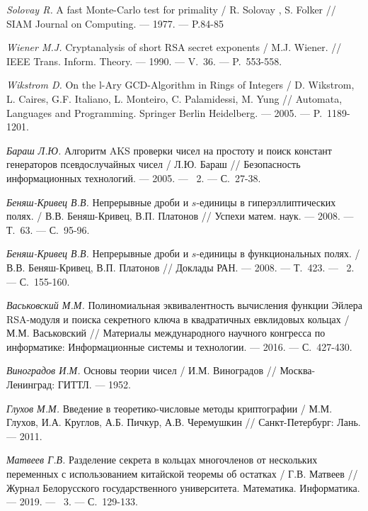 \begin{thebibliography}{99}
    \textit{Solovay R.} A fast Monte-Carlo test for primality / R. Solovay , S. Folker // SIAM Journal on Computing. --- 1977. --- P.84-85
    
    \textit{Wiener M.J.} Cryptanalysis of short RSA secret exponents / M.J. Wiener. // IEEE Trans. Inform. Theory. --- 1990. --- V.~36. --- P.~553-558.

    \textit{Wikstrom D.} On the l-Ary GCD-Algorithm in Rings of Integers / D. Wikstrom, L. Caires, G.F. Italiano, L. Monteiro, C. Palamidessi, M. Yung // Automata, Languages and Programming. Springer Berlin Heidelberg. --- 2005. --- P.~1189-1201.

    \textit{Бараш Л.Ю.} Алгоритм AKS проверки чисел на простоту и поиск констант генераторов псевдослучайных чисел / Л.Ю. Бараш // Безопасность информационных технологий. --- 2005. --- \textnumero~2. --- С.~27-38.

    \textit{Беняш-Кривец В.В.} Непрерывные дроби и $s$-единицы в гиперэллиптических полях. / В.В. Беняш-Кривец, В.П. Платонов // Успехи матем. наук. --- 2008. --- Т.~63. --- С.~95-96.
    
    \textit{Беняш-Кривец В.В.} Непрерывные дроби и $s$-единицы в функциональных полях. / В.В. Беняш-Кривец, В.П. Платонов // Доклады РАН. --- 2008. --- Т.~423. --- \textnumero~2. --- С.~155-160.

    \textit{Васьковский М.М.} Полиномиальная эквивалентность вычисления функции Эйлера RSA-модуля и поиска секретного ключа в квадратичных евклидовых кольцах / М.М. Васьковский // Материалы международного научного конгресса по информатике: Информационные системы и технологии. --- 2016. --- С.~427-430.

    \textit{Виноградов И.М.} Основы теории чисел / И.М. Виноградов // Москва-Ленинград: ГИТТЛ. --- 1952.

    \textit{Глухов М.М.} Введение в теоретико-числовые методы криптографии / М.М. Глухов, И.А. Круглов, А.Б. Пичкур, А.В. Черемушкин // Санкт-Петербург: Лань. --- 2011.
    
    \textit{Матвеев Г.В.} Разделение секрета в кольцах многочленов от нескольких переменных с использованием китайской теоремы об остатках / Г.В. Матвеев // Журнал Белорусского государственного университета. Математика. Информатика. --- 2019. --- \textnumero~3. --- С.~129-133.
    

\end{thebibliography}
